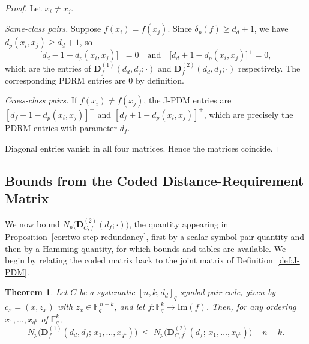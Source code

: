 \documentclass[11pt,draftclsnofoot,journal,onecolumn]{IEEEtran}
\newtheorem{theorem}{Theorem}
\begin{document}
    \begin{proof}
    Let $x_i \neq x_j$.

    \emph{Same-class pairs.} Suppose $f(x_i) = f(x_j)$. Since $\delta_p(f) \ge d_d + 1$, we have $d_p(x_i,x_j) \ge d_d + 1$, so
    \[
    \bigl[d_d - 1 - d_p(x_i,x_j)\bigr]^{+} = 0
    \quad\text{and}\quad
    \bigl[d_d + 1 - d_p(x_i,x_j)\bigr]^{+} = 0 ,
    \]
    which are the entries of $\boldsymbol{D}^{(1)}_{f}(d_d,d_f;\cdot)$ and $\boldsymbol{D}^{(2)}_{f}(d_d,d_f;\cdot)$ respectively. The corresponding PDRM entries are $0$ by definition.

    \emph{Cross-class pairs.} If $f(x_i) \neq f(x_j)$, the J-PDM entries are $[d_f - 1 - d_p(x_i,x_j)]^{+}$ and $[d_f + 1 - d_p(x_i,x_j)]^{+}$, which are precisely the PDRM entries with parameter $d_f$.

    Diagonal entries vanish in all four matrices. Hence the matrices coincide.
    \end{proof}


        





\subsection{Bounds from the Coded Distance-Requirement Matrix}

    
    
    We now bound $N_p\bigl(\boldsymbol{D}^{(2)}_{C,f}(d_f;\cdot)\bigr)$, the quantity appearing in Proposition~\ref{cor:two-step-redundancy}, first by a scalar symbol-pair quantity and then by a Hamming quantity, for which bounds and tables are available. We begin by relating the coded matrix back to the joint matrix of Definition~\ref{def:J-PDM}.

  \begin{theorem}\label{thm:pair-matrix-two-step}
    Let $C$ be a systematic $[n,k,d_d]_q$ symbol-pair code, given by $c_x=(x,z_x)$ with $z_x\in\mathbb{F}_q^{\,n-k}$, and let $f:\mathbb{F}_q^{k}\to\mathrm{Im}(f)$. Then, for any ordering $x_1,\dots,x_{q^k}$ of $\mathbb{F}_q^{k}$,
    \[
      N_p\bigl(\boldsymbol{D}^{(1)}_{f}(d_d,d_f;\,x_1,\dots,x_{q^k})\bigr)
      \;\le\;
      N_p\bigl(\boldsymbol{D}^{(2)}_{C,f}(d_f;\,x_1,\dots,x_{q^k})\bigr)+n-k .
    \]
    \end{theorem}
\end{document}
